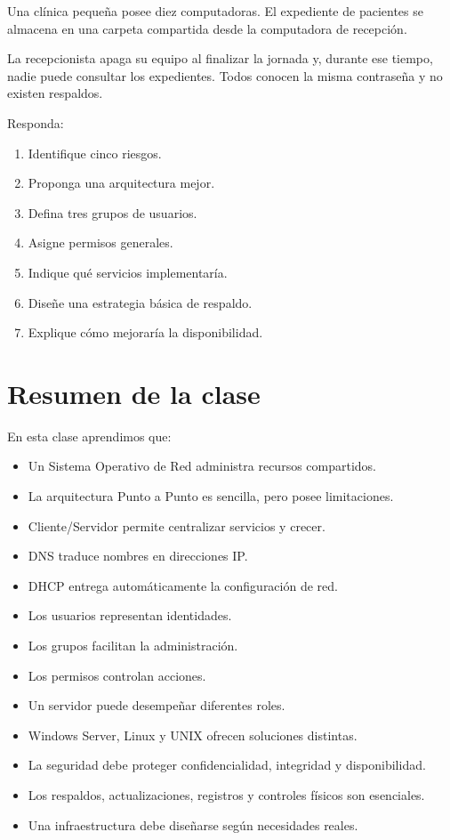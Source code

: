 \documentclass[
  spanish,
  letterpaper,
]{scrbook}
\providecommand{\tightlist}{%
  \setlength{\itemsep}{0pt}\setlength{\parskip}{0pt}}
\begin{document}
Una clínica pequeña posee diez computadoras. El expediente de pacientes
se almacena en una carpeta compartida desde la computadora de recepción.

La recepcionista apaga su equipo al finalizar la jornada y, durante ese
tiempo, nadie puede consultar los expedientes. Todos conocen la misma
contraseña y no existen respaldos.

Responda:

\begin{enumerate}
\def\labelenumi{\arabic{enumi}.}
\tightlist
\item
  Identifique cinco riesgos.
\item
  Proponga una arquitectura mejor.
\item
  Defina tres grupos de usuarios.
\item
  Asigne permisos generales.
\item
  Indique qué servicios implementaría.
\item
  Diseñe una estrategia básica de respaldo.
\item
  Explique cómo mejoraría la disponibilidad.
\end{enumerate}


\chapter{Resumen de la clase}\label{resumen-de-la-clase-2}

En esta clase aprendimos que:

\begin{itemize}
\tightlist
\item
  Un Sistema Operativo de Red administra recursos compartidos.
\item
  La arquitectura Punto a Punto es sencilla, pero posee limitaciones.
\item
  Cliente/Servidor permite centralizar servicios y crecer.
\item
  DNS traduce nombres en direcciones IP.
\item
  DHCP entrega automáticamente la configuración de red.
\item
  Los usuarios representan identidades.
\item
  Los grupos facilitan la administración.
\item
  Los permisos controlan acciones.
\item
  Un servidor puede desempeñar diferentes roles.
\item
  Windows Server, Linux y UNIX ofrecen soluciones distintas.
\item
  La seguridad debe proteger confidencialidad, integridad y
  disponibilidad.
\item
  Los respaldos, actualizaciones, registros y controles físicos son
  esenciales.
\item
  Una infraestructura debe diseñarse según necesidades reales.
\end{itemize}
\end{document}
